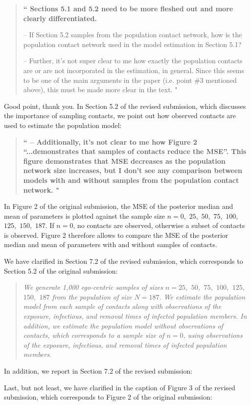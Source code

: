 \documentclass[12pt]{article}
\renewcommand{\=}{&=&}
\renewcommand{\hide}[1]{}
\renewcommand{\bbq}{\vspace{.05cm}\begin{quote}\bf``}
\renewcommand{\ebq}{\hspace{-.15cm}"\end{quote}}
\newcommand{\bauthq}{\vspace{.05cm}\begin{quote}\em}
\newcommand{\eauthq}{\hspace{-.25cm}\end{quote}}
\renewcommand{\=}{&=&}
\begin{document}
\vspace{-.25cm}

\bbq
Sections 5.1 and 5.2 need to be more fleshed out and more clearly differentiated.

– If Section 5.2 samples from the population contact network, how is the population contact network used in the model estimation in Section 5.1?

– Further, it’s not super clear to me how exactly the population contacts are or are not incorporated in the estimation, in general. Since this seems to be one of the main arguments in the paper (i.e. point \#3 mentioned above), this must be made more clear in the text.
\ebq

Good point,
thank you.
In Section 5.2 of the revised submission,
which discusses the importance of sampling contacts,
we point out how observed contacts are used to estimate the population model:
\bauthq\eauthq

\hide{

In Section 6.2,
which corresponds to Section 4.3 of the original submission,
we remind readers:
\bauthq
As pointed out in Section 5.2,
sampling contacts helps infer the unobserved sources of infections,
which in turn helps infer the population model.
\eauthq

}

\vspace{-.15cm}

\bbq
– Additionally, it’s not clear to me how Figure 2 “...demonstrates that samples of contacts reduce the MSE”. This figure demonstrates that MSE decreases as the population network size increases, but I don’t see any comparison between models with and without samples from the population contact network.
\ebq

In Figure 2 of the original submission,
the MSE of the posterior median and mean of parameters is plotted against the sample size $n = 0$,\, $25$,\, $50$,\, $75$,\, $100$,\, $125$,\, $150$,\, $187$.
If $n=0$, 
no contacts are observed,
otherwise a subset of contacts is observed.
Figure 2 therefore allows to compare the MSE of the posterior median and mean of parameters with and without samples of contacts.

We have clarified in Section 7.2 of the revised submission,
which corresponds to Section 5.2 of the original submission:
\bauthq
We generate 1,000 ego-centric samples of sizes $n = 25$,\, $50$,\, $75$,\, $100$,\, $125$,\, $150$,\, $187$ from the population of size $N = 187$.
We estimate the population model from each sample of contacts along with observations of the exposure, infectious, and removal times of infected population members.
In addition,
we estimate the population model without observations of contacts,
which corresponds to a sample size of $n=0$,
using observations of the exposure, infectious, and removal times of infected population members.
\eauthq
In addition,
we report in Section 7.2 of the revised submission:
\bauthq\eauthq
Last,
but not least,
we have clarified in the caption of Figure 3 of the revised submission, 
which corresponds to Figure 2 of the original submission:
\bauthq\eauthq
\end{document}
